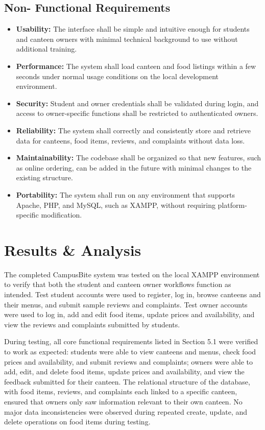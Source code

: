 \documentclass[ 12pt,a4paper,twocolumn,fleqn]{article}
\begin{document}
\subsection{Non- Functional Requirements}
\begin{itemize}
\item \textbf{Usability:} The interface shall be simple and intuitive enough for students and canteen owners with minimal technical background to use without additional training.
\item \textbf{Performance:} The system shall load canteen and food listings within a few seconds under normal usage conditions on the local development environment.
\item \textbf{Security:} Student and owner credentials shall be validated during login, and access to owner-specific functions shall be restricted to authenticated owners.
\item \textbf{Reliability:} The system shall correctly and consistently store and retrieve data for canteens, food items, reviews, and complaints without data loss.
\item \textbf{Maintainability:} The codebase shall be organized so that new features, such as online ordering, can be added in the future with minimal changes to the existing structure.
\item \textbf{Portability:} The system shall run on any environment that supports Apache, PHP, and MySQL, such as XAMPP, without requiring platform-specific modification.
\end{itemize}

\clearpage

\newpage

\section{Results \& Analysis}

The completed CampusBite system was tested on the local XAMPP environment to verify that both the student and canteen owner workflows function as intended. Test student accounts were used to register, log in, browse canteens and their menus, and submit sample reviews and complaints. Test owner accounts were used to log in, add and edit food items, update prices and availability, and view the reviews and complaints submitted by students.

During testing, all core functional requirements listed in Section 5.1 were verified to work as expected: students were able to view canteens and menus, check food prices and availability, and submit reviews and complaints; owners were able to add, edit, and delete food items, update prices and availability, and view the feedback submitted for their canteen. The relational structure of the database, with food items, reviews, and complaints each linked to a specific canteen, ensured that owners only saw information relevant to their own canteen. No major data inconsistencies were observed during repeated create, update, and delete operations on food items during testing.
\end{document}
